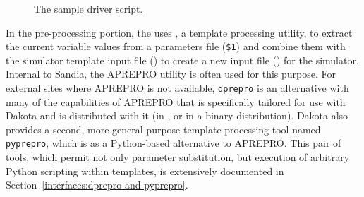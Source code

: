 \begin{figure}
  \centering
  \begin{bigbox}
    \begin{small}
    \end{small}
  \end{bigbox}
  \caption{The \protect{} sample driver script.}
  \label{advint:figure02}
\end{figure}


In the pre-processing portion, the  uses
, a template processing utility, to extract the
current variable values from a parameters file (\texttt{\$1})
and combine them with the simulator template input file
() to create a new input file ()
for the simulator. Internal to Sandia, the APREPRO utility is often
used for this purpose. For external sites where APREPRO is not
available, \texttt{dprepro} is an alternative with many of the 
capabilities of APREPRO that is specifically tailored for use with Dakota
and is distributed with it (in , or
 in a binary distribution). Dakota also provides a second,
more general-purpose template processing tool named \texttt{pyprepro}, 
which is as a Python-based alternative to APREPRO. This pair of
tools, which permit not only parameter substitution, but execution of
arbitrary Python scripting within templates, is extensively documented in 
Section~\ref{interfaces:dprepro-and-pyprepro}.

